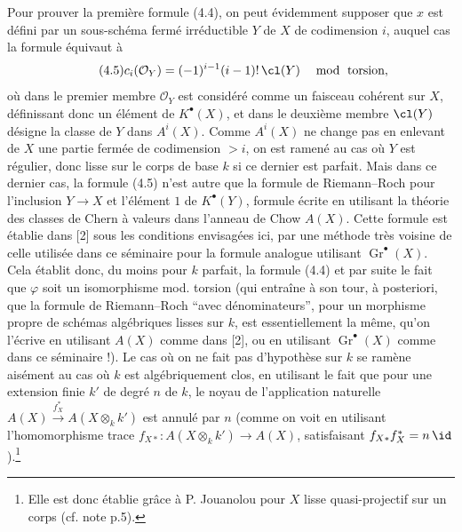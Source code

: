 Pour prouver la première formule (4.4), on peut évidemment supposer que $x$ est défini par un sous-schéma fermé irréductible $Y$ de $X$ de codimension $i$, auquel cas la formule équivaut à
\begin{equation}\tag{4.5}
 c_i(\mathcal O_Y)=(-1)^{i-1}(i-1)!\,\cl(Y)\quad \bmod
\text{ torsion},
\end{equation}
où dans le premier membre $\mathcal O_Y$ est considéré comme un faisceau cohérent sur $X$, définissant donc un élément de $K^\bullet(X)$, et dans le deuxième membre $\cl(Y)$ désigne la classe de $Y$ dans $A^i(X)$. Comme $A^i(X)$ ne change pas en enlevant de $X$ une partie fermée de codimension $>i$, on est ramené au cas où $Y$ est régulier, donc lisse sur le corps de base $k$ si ce dernier est parfait. Mais dans ce dernier cas, la formule (4.5) n'est autre que la formule de Riemann--Roch pour l'inclusion $Y\to X$ et l'élément $1$ de $K^\bullet(Y)$, formule écrite en utilisant la théorie des classes de Chern à valeurs dans l'anneau de Chow $A(X)$. Cette formule est établie dans [2] sous les conditions envisagées ici, par une méthode très voisine de celle utilisée dans ce séminaire pour la formule analogue utilisant $\operatorname{Gr}^\bullet(X)$. Cela établit donc, du moins pour $k$ parfait, la formule (4.4) et par suite le fait que $\varphi$ soit un isomorphisme mod. torsion (qui entraîne à son tour, à posteriori, que la formule de Riemann--Roch ``avec dénominateurs'', pour un morphisme propre de schémas algébriques lisses sur $k$, est essentiellement la même, qu'on l'écrive en utilisant $A(X)$ comme dans [2], ou en utilisant $\operatorname{Gr}^\bullet(X)$ comme dans ce séminaire !). Le cas où on ne fait pas d'hypothèse sur $k$ se ramène aisément au cas où $k$ est algébriquement clos, en utilisant le fait que pour une extension finie $k'$ de degré $n$ de $k$, le noyau de l'application naturelle $A(X)\xrightarrow{f_X^*}A(X\otimes_k k')$ est annulé par $n$ (comme on voit en utilisant l'homomorphisme trace $f_{X*}:A(X\otimes_k k')\to A(X)$, satisfaisant $f_{X*}f_X^*=n\,\id$).\footnote{Elle est donc établie grâce à P. Jouanolou pour $X$ lisse quasi-projectif sur un corps (cf. note p.5).}

